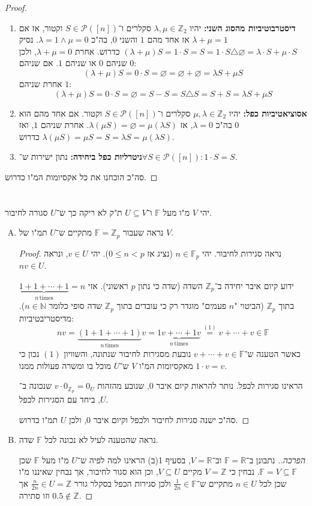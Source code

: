 \documentclass[]{article}
\newcommand\N     {\mathbb{N}}
\newcommand\Z     {\mathbb{Z}}
\newcommand\R     {\mathbb{R}}
\newcommand\ps    {\mathcal{P}}
\newcommand\trio  {\triangle}
\newcommand\F         {\mathbb{F}}
\newcommand\co        {\colon}
\renewcommand\lg      {\lambda}
\theoremstyle{definition}
\begin{document}
\begin{proof}
\begin{enumerate}
			\item \textbf{דיסטרבוטיביות מהסוג השני: }יהיו $\lg, \mu \in \Z_2$ סקלרים ו־$S \in \ps([n])$ וקטור, אז אם $\lg + \mu = 1$ אז אחד מהם $1$ והשני $0$, בה"כ $\lg = 1 \land \mu = 0$. נסיק 
			$(\lg + \mu)S = 1 \cdot S = S = 1 \cdot S \trio \varnothing = \lg \cdot S + \mu \cdot S$
			כדרוש. אחרת $\lg + \mu = 0$, ולכן שניהם $0$ או שניהם $1$. אם שניהם $0$: 
			\[ (\lg + \mu)S = 0 \cdot S = \varnothing = \varnothing + \varnothing = \lg S + \mu S \]
			אחרת שניהם $1$: 
			\[ (\lg + \mu)S = 0 \cdot S = \varnothing = S - S = S \trio S = S + S = \lg S + \mu S \]
			\item \textbf{אסוציאטיביות כפל: }יהיו $\mu, \lg \in \Z_2$ סקלרים ו־$S \in \ps([n])$ וקטור. אם אחד מהם הוא $0$ בה"כ $\lg = 0$, אז $\lg (\mu S) = \varnothing = \mu (\lg S)$. אחרת שניהם $1$, ואז $\lg (\mu S) = \mu S = S = \lg S = \mu (\lg S)$ כדרוש. 
			\item \textbf{ניטרליות כפל ביחידה: }נתון ישירות ש־$\forall S \in \ps([n])\co 1 \cdot S = S$. 
		\end{enumerate}
		סה"כ הוכחנו את כל אקסיומות המ"ו כדרוש. 
	\end{proof}
	\section{}
	יהי $V$ מ"ו מעל $\F$ ו־$U \subseteq V$ ת"ק לא ריקה כך ש־$U$ סגורה לחיבור. 
	\begin{enumerate}[(A)]
		\item נראה שעבור $\F = \Z_p$ מתקיים ש־$U$ תמ"ו של $V$. \begin{proof}
			נראה סגירות לחיבור. יהי $n \in \F_p$ (נציג אז $0 \le n < p$). יהי $v \in U$, ונראה $nv \in U$. 
			
			ידוע קיום איבר יחידה ב־$\Z_p$ השדה (שדה כי נתון $p$ ראשוני). אזי $\underbrace{1 + 1 + \cdots + 1}_{n\, \mathrm{times}} = n$ בתוך $\Z_p$ (הביטוי "$n$ פעמים" מוגדר רק כי עובדים בתוך $\Z_p$ שדה סופי כלומר $n \in \N$). מדיסטריבטיביות: 
			\[ nv = \underbrace{(1 + 1 + \cdots + 1)}_{n\, \mathrm{times}}v = \underbrace{1v + \cdots + 1v}_{n\, \mathrm{times}} \overset{(1)}{=} v + \cdots + v \in \F \]
				כאשר הטענה ש־$v + \cdots + v \in \F$ נובעת מסגירות לחיבור שנתונה, והשוויון $(1)$ נכון כי $1 \cdot v = v$ מאקסיומות המ"ו $V$ ש־$U$ מוכל בו ומשרה פעולות ממנו. 
				
				הראינו סגירות לכפל. נותר להראות קיום איבר $0$, שנובע מהזהות $v \cdot 0_{\Z_p} = 0_U$ שנכונה ב־$U$, ביחד עם הסגירות לכפל. 
				
				סה"כ ישנה סגירות לחיבור ולכפל וקיום איבר $0$, ולכן $U$ תמ"ו כדרוש. 
		\end{proof}
		\item נראה שהטענה לעיל לא נכונה לכל $\F$ שדה. \begin{proof}[הפרכה.]
			נתבונן ב־$\F = \R$ וב־$V = \R$, בסעיף 1(ב) הראינו למה לפיה ש־$U$ מ"ו מעל $\F$ שכן $\F = V \subseteq \F$. נבחין כי $V = \Z$ מקיים $V \subseteq U$, וכן הוא סגור לחיבור, אך נבחין שאיננו מ"ו שכן לכל $n \in U$ מתקיים ש־$\frac{1}{2n} \in \F$ ולכן סגירות הכפל בסקלר גורר $\frac{n}{2n} \in U = \Z$ אך $0.5 \notin \Z$ וזו סתירה. 
		\end{proof}
	\end{enumerate}
	
\end{document}

